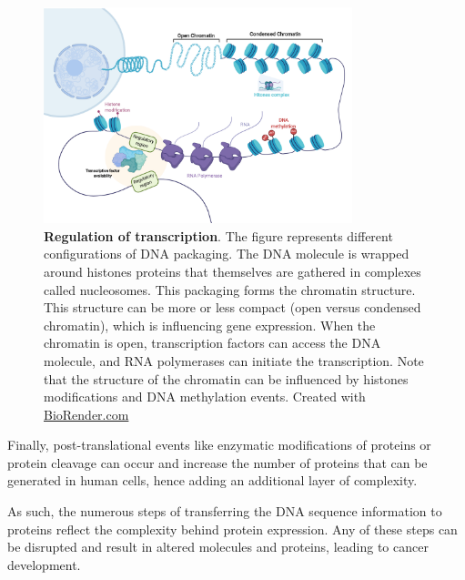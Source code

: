 \begin{figure}[H]
    \centering
    \includegraphics[width=0.8\textwidth]{Figures/Intro/transcription_regulation.pdf}
    \caption[Regulation of transcription]{\textbf{Regulation of transcription}. The figure represents different configurations of \gls*{DNA} packaging. The \gls*{DNA} molecule is wrapped around histones proteins that themselves are gathered in complexes called nucleosomes. This packaging forms the chromatin structure. This structure can be more or less compact (open versus condensed chromatin), which is influencing gene expression. When the chromatin is open, transcription factors can access the \gls*{DNA} molecule, and \gls*{RNA} polymerases can initiate the transcription. Note that the structure of the chromatin can be influenced by histones modifications and \gls*{DNA} methylation events. Created with \href{https://biorender.com/}{BioRender.com}}
    \label{fig:intro_fig2}
\end{figure}
Finally, post-translational events like enzymatic modifications of proteins or protein cleavage can occur and increase the number of proteins that can be generated in human cells, hence adding an additional layer of complexity.


As such, the numerous steps of transferring the \gls*{DNA} sequence information to proteins reflect the complexity behind protein expression. Any of these steps can be disrupted and result in altered molecules and proteins, leading to cancer development.  

